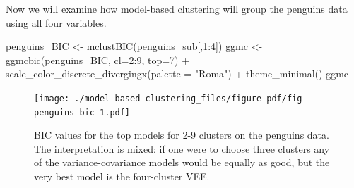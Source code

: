 \documentclass[
  letterpaper,
]{book}
\newenvironment{Shaded}{\begin{snugshade}}{\end{snugshade}}
\newcommand{\AttributeTok}[1]{\textcolor[rgb]{0.40,0.45,0.13}{#1}}
\newcommand{\DecValTok}[1]{\textcolor[rgb]{0.68,0.00,0.00}{#1}}
\newcommand{\FunctionTok}[1]{\textcolor[rgb]{0.28,0.35,0.67}{#1}}
\newcommand{\NormalTok}[1]{\textcolor[rgb]{0.00,0.23,0.31}{#1}}
\newcommand{\OtherTok}[1]{\textcolor[rgb]{0.00,0.23,0.31}{#1}}
\newcommand{\SpecialCharTok}[1]{\textcolor[rgb]{0.37,0.37,0.37}{#1}}
\newcommand{\StringTok}[1]{\textcolor[rgb]{0.13,0.47,0.30}{#1}}
\begin{document}
Now we will examine how model-based clustering will group the penguins
data using all four variables.

\begin{Shaded}
\begin{Highlighting}[]
\NormalTok{penguins\_BIC }\OtherTok{\textless{}{-}} \FunctionTok{mclustBIC}\NormalTok{(penguins\_sub[,}\DecValTok{1}\SpecialCharTok{:}\DecValTok{4}\NormalTok{])}
\NormalTok{ggmc }\OtherTok{\textless{}{-}} \FunctionTok{ggmcbic}\NormalTok{(penguins\_BIC, }\AttributeTok{cl=}\DecValTok{2}\SpecialCharTok{:}\DecValTok{9}\NormalTok{, }\AttributeTok{top=}\DecValTok{7}\NormalTok{) }\SpecialCharTok{+} 
  \FunctionTok{scale\_color\_discrete\_divergingx}\NormalTok{(}\AttributeTok{palette =} \StringTok{"Roma"}\NormalTok{) }\SpecialCharTok{+}
  \FunctionTok{theme\_minimal}\NormalTok{() }
\NormalTok{ggmc}
\end{Highlighting}
\end{Shaded}

\begin{figure}[H]

{\centering \texttt{[image: ./model-based-clustering\_files/figure-pdf/fig-penguins-bic-1.pdf]}

}

\caption{\label{fig-penguins-bic}BIC values for the top models for 2-9
clusters on the penguins data. The interpretation is mixed: if one were
to choose three clusters any of the variance-covariance models would be
equally as good, but the very best model is the four-cluster VEE.}

\end{figure}
\end{document}

